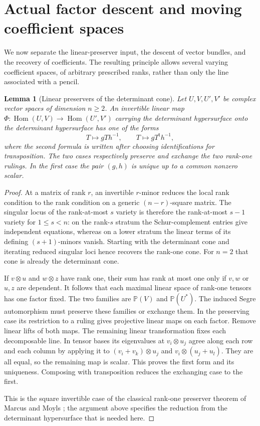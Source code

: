 \documentclass[11pt,reqno]{amsart}
\numberwithin{equation}{section}
\newtheorem{lemma}[theorem]{Lemma}
\theoremstyle{definition}\newtheorem{definition}[theorem]{Definition}
\theoremstyle{remark}\newtheorem{remark}[theorem]{Remark}
\newcommand{\Pj}{\mathbb P}\newcommand{\A}{\mathbb A}
\DeclareMathOperator{\Hom}{Hom}\DeclareMathOperator{\Tot}{Tot}
\begin{document}

\section{Actual factor descent and moving coefficient spaces}
\label{sec:coefficient-descent-v147}

We now separate the linear-preserver input, the descent of vector
bundles, and the recovery of coefficients.  The resulting principle
allows several varying coefficient spaces, of arbitrary prescribed
ranks, rather than only the line associated with a pencil.

\begin{lemma}[Linear preservers of the determinant cone]
\label{lem:linear-preserver-v147}
Let \(U,V,U',V'\) be complex vector spaces of dimension \(n\ge2\).
An invertible linear map
\(\Phi:\Hom(U,V)\to\Hom(U',V')\) carrying the determinant
hypersurface onto the determinant hypersurface has one of the forms
\[
 T\longmapsto gTh^{-1},\qquad
 T\longmapsto gT^{\mathsf t}h^{-1},
\]
where the second formula is written after choosing identifications
for transposition.  The two cases respectively preserve and exchange
the two rank-one rulings.  In the first case the pair \((g,h)\)
is unique up to a common nonzero scalar.
\end{lemma}
\begin{proof}
At a matrix of rank \(r\), an invertible \(r\)-minor reduces the
local rank condition to the rank condition on a generic
\((n-r)\)-square matrix.  The singular locus of the rank-at-most
\(s\) variety is therefore the rank-at-most \(s-1\) variety for
\(1\le s<n\): on the rank-\(s\) stratum the Schur-complement
entries give independent equations, whereas on a lower stratum the
linear terms of its defining \((s+1)\)-minors vanish.  Starting
with the determinant cone and iterating reduced singular loci hence
recovers the rank-one cone.  For \(n=2\) that cone is already the
determinant cone.

If \(v\otimes u\) and \(w\otimes z\) have rank one, their sum
has rank at most one only if \(v,w\) or \(u,z\) are dependent.
It follows that each maximal linear space of rank-one tensors has
one factor fixed.  The two families are
\(\Pj(V)\) and \(\Pj(U^*)\).  The induced Segre automorphism
must preserve these families or exchange them.  In the preserving
case its restriction to a ruling gives projective linear maps on
each factor.  Remove linear lifts of both maps.  The remaining
linear transformation fixes each decomposable line.  In tensor bases
its eigenvalues at \(v_i\otimes u_j\) agree along each row and
each column by applying it to
\((v_i+v_k)\otimes u_j\) and \(v_i\otimes(u_j+u_l)\).
They are all equal, so the remaining map is scalar.  This proves
the first form and its uniqueness.  Composing with transposition
reduces the exchanging case to the first.

This is the square invertible case of the classical rank-one
preserver theorem of Marcus and Moyls
\cite[Theorem~1, pp.~1218--1219]{MarcusMoyls}; the argument above
specifies the reduction from the determinant hypersurface that is
needed here.
\end{proof}
\end{document}
